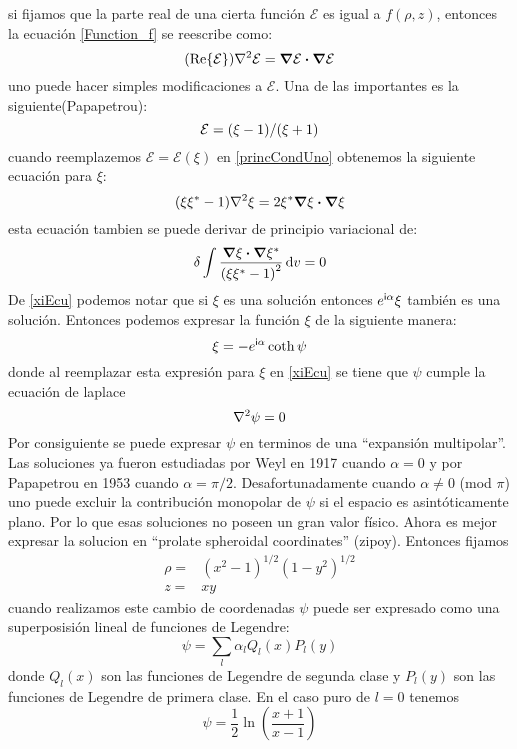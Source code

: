 \documentclass[../Main.tex]{subfiles}
\begin{document}
%
si fijamos que la parte real de una cierta función $\mathcal{E}$ es igual a $f(\rho,z)$, entonces la ecuación \eqref{Function_f} se reescribe como:
%
\begin{equation}
    \qty(\Re{\mathcal{E}})\laplacian{\mathcal{E}}=\grad{\mathcal{E}}\vdot\grad{\mathcal{E}}
    \label{princCondUno}
\end{equation}
%
uno puede hacer simples modificaciones a $\mathcal{E}$. Una de las importantes es la siguiente(Papapetrou):
%
\begin{equation}
    \mathcal{E}=\qty(\xi-1)/\qty(\xi+1)
    \label{Eecu}
\end{equation}
%
cuando reemplazemos $\mathcal{E}=\mathcal{E}(\xi)$ en \eqref{princCondUno} obtenemos la siguiente ecuación para $\xi$:
%
\begin{equation}
    \qty(\xi\xi^{*}-1)\laplacian{\xi}=2\xi^{*}\grad{\xi}\vdot\grad{\xi}
    \label{xiEcu}
\end{equation}
%
esta ecuación tambien se puede derivar de principio variacional de:
%
\begin{equation}
    \delta\int\dfrac{\grad{\xi}\vdot\grad{\xi}^{*}}{\qty(\xi\xi^{*}-1)^{2}}\dd{v}=0
\end{equation}
%
De \eqref{xiEcu} podemos notar que si $\xi$ es una solución entonces $e^{\mathsf{i}\alpha}\xi$ también es una solución. Entonces podemos expresar la función $\xi$ de la siguiente manera:
%
\begin{equation}
    \xi=-e^{\mathsf{i}\alpha}\coth{\psi}
    \label{psiEcu}
\end{equation}
%
donde al reemplazar esta expresión para $\xi$ en \eqref{xiEcu} se tiene que $\psi$ cumple la ecuación de laplace
%
\begin{equation}
    \laplacian{\psi}=0
\end{equation}
%
Por consiguiente se puede expresar $\psi$ en terminos de una ``expansión multipolar''. Las soluciones ya fueron estudiadas por Weyl en 1917 cuando $\alpha=0$ y por Papapetrou en 1953 cuando $\alpha=\pi/2$. Desafortunadamente cuando $\alpha \neq 0$ (mod $\pi$) uno puede excluir la contribución monopolar de $\psi$ si el espacio es asintóticamente plano. Por lo que esas soluciones no poseen un gran valor físico.
%
Ahora es mejor expresar la solucion en ``prolate spheroidal coordinates'' (zipoy). Entonces fijamos
%
\begin{eqnarray}
    \rho= & (x^2-1)^{1/2}(1-y^{2})^{1/2} \\
    z = & xy
\end{eqnarray}
%
cuando realizamos este cambio de coordenadas $\psi$ puede ser expresado como una superposisión lineal de funciones de Legendre:
%
\begin{equation}
    \psi=\sum_{l}\alpha_{l}Q_{l}(x)P_{l}(y)
\end{equation}
%
donde $Q_{l}(x)$ son las funciones de Legendre de segunda clase y $P_{l}(y)$ son las funciones de Legendre de primera clase. En el caso puro de $l=0$ tenemos
%
\begin{equation}
    \psi=\frac{1}{2}\ln(\dfrac{x+1}{x-1})
\end{equation}
\end{document}
